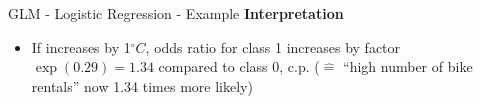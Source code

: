 \documentclass[10pt,compress,t,notes=noshow, xcolor=table]{beamer}
\begin{document}
\begin{frame}{GLM - Logistic Regression - Example}
\textbf{Interpretation}
\begin{itemize}
    \item If  increases by 1$^\circ C$, odds ratio for class 1 increases by factor $\exp (0.29) = 1.34$ compared to class 0, c.p. ($\hat =$ ``high number of bike rentals'' now 1.34 times more likely)
\end{itemize}
\end{frame}










\end{document}
